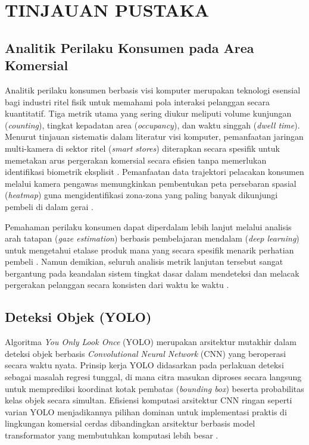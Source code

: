 \chapter[TINJAUAN PUSTAKA]{TINJAUAN PUSTAKA}
\sloppy

\section{Analitik Perilaku Konsumen pada Area Komersial}

Analitik perilaku konsumen berbasis visi komputer merupakan teknologi esensial bagi industri ritel fisik untuk memahami pola interaksi pelanggan secara kuantitatif. Tiga metrik utama yang sering diukur meliputi volume kunjungan (\textit{counting}), tingkat kepadatan area (\textit{occupancy}), dan waktu singgah (\textit{dwell time}). Menurut tinjauan sistematis dalam literatur visi komputer, pemanfaatan jaringan multi-kamera di sektor ritel (\textit{smart stores}) diterapkan secara spesifik untuk memetakan arus pergerakan komersial secara efisien tanpa memerlukan identifikasi biometrik eksplisit \cite{fierrosilva2026}. Pemanfaatan data trajektori pelacakan konsumen melalui kamera pengawas memungkinkan pembentukan peta persebaran spasial (\textit{heatmap}) guna mengidentifikasi zona-zona yang paling banyak dikunjungi pembeli di dalam gerai \cite{narvilas2022}.

Pemahaman perilaku konsumen dapat diperdalam lebih lanjut melalui analisis arah tatapan (\textit{gaze estimation}) berbasis pembelajaran mendalam (\textit{deep learning}) untuk mengetahui etalase produk mana yang secara spesifik menarik perhatian pembeli \cite{senarath2022}. Namun demikian, seluruh analisis metrik lanjutan tersebut sangat bergantung pada keandalan sistem tingkat dasar dalam mendeteksi dan melacak pergerakan pelanggan secara konsisten dari waktu ke waktu \cite{shili2024electronics}.

\section{Deteksi Objek (YOLO)}

Algoritma \textit{You Only Look Once} (YOLO) merupakan arsitektur mutakhir dalam deteksi objek berbasis \textit{Convolutional Neural Network} (CNN) yang beroperasi secara waktu nyata. Prinsip kerja YOLO didasarkan pada perlakuan deteksi sebagai masalah regresi tunggal, di mana citra masukan diproses secara langsung untuk memprediksi koordinat kotak pembatas (\textit{bounding box}) beserta probabilitas kelas objek secara simultan. Efisiensi komputasi arsitektur CNN ringan seperti varian YOLO menjadikannya pilihan dominan untuk implementasi praktis di lingkungan komersial cerdas dibandingkan arsitektur berbasis model transformator yang membutuhkan komputasi lebih besar \cite{fierrosilva2026}.

